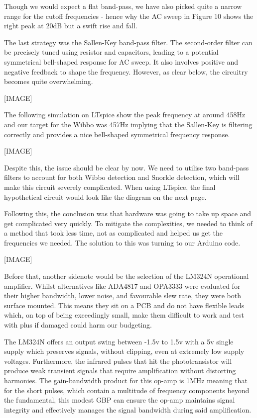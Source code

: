 Though we would expect a flat band-pass, we have also picked quite a narrow range for the cutoff frequencies - hence why the AC sweep in Figure 10 shows the right peak at 20dB but a swift rise and fall.

The last strategy was the Sallen-Key band-pass filter. The second-order filter can be precisely tuned using resistor and capacitors, leading to a potential symmetrical bell-shaped response for AC sweep. It also involves positive and negative feedback to shape the frequency. However, as clear below, the circuitry becomes quite overwhelming.

    [IMAGE]

The following simulation on LTspice show the peak frequency at around 458Hz and our target for the Wibbo was 457Hz implying that the Sallen-Key is filtering correctly and provides a nice bell-shaped symmetrical frequency response.

    [IMAGE]

Despite this, the issue should be clear by now. We need to utilise two band-pass filters to account for both Wibbo detection and Snorkle detection, which will make this circuit severely complicated. When using LTspice, the final hypothetical circuit would look like the diagram on the next page.

Following this, the conclusion was that hardware was going to take up space and get complicated very quickly. To mitigate the complexities, we needed to think of a method that took less time, not as complicated and helped us get the frequencies we needed. The solution to this was turning to our Arduino code.

    [IMAGE]

Before that, another sidenote would be the selection of the LM324N operational amplifier. Whilst alternatives like ADA4817 and OPA3333 were evaluated for their higher bandwidth, lower noise, and favourable slew rate, they were both surface mounted. This means they sit on a PCB and do not have flexible leads which, on top of being exceedingly small, make them difficult to work and test with plus if damaged could harm our budgeting.

The LM324N offers an output swing between -1.5v to 1.5v with a 5v single supply which preserves signals, without clipping, even at extremely low supply voltages. Furthermore, the infrared pulses that hit the phototransistor will produce weak transient signals that require amplification without distorting harmonies. The gain-bandwidth product for this op-amp is 1MHz meaning that for the short pulses, which contain a multitude of frequency components beyond the fundamental, this modest GBP can ensure the op-amp maintains signal integrity and effectively manages the signal bandwidth during said amplification.


